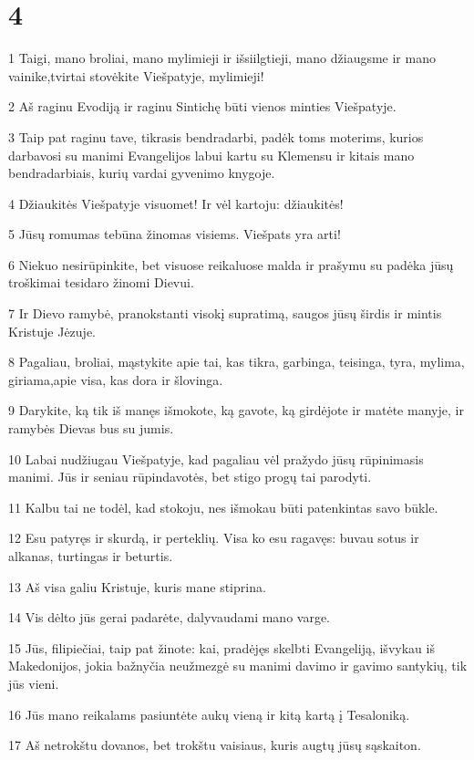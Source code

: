 \chapter{4}


\par 1 Taigi, mano broliai, mano mylimieji ir išsiilgtieji, mano džiaugsme ir mano vainike,­tvirtai stovėkite Viešpatyje, mylimieji! 
\par 2 Aš raginu Evodiją ir raginu Sintichę būti vienos minties Viešpatyje. 
\par 3 Taip pat raginu tave, tikrasis bendradarbi, padėk toms moterims, kurios darbavosi su manimi Evangelijos labui kartu su Klemensu ir kitais mano bendradarbiais, kurių vardai gyvenimo knygoje. 
\par 4 Džiaukitės Viešpatyje visuomet! Ir vėl kartoju: džiaukitės! 
\par 5 Jūsų romumas tebūna žinomas visiems. Viešpats yra arti! 
\par 6 Niekuo nesirūpinkite, bet visuose reikaluose malda ir prašymu su padėka jūsų troškimai tesidaro žinomi Dievui. 
\par 7 Ir Dievo ramybė, pranokstanti visokį supratimą, saugos jūsų širdis ir mintis Kristuje Jėzuje. 
\par 8 Pagaliau, broliai, mąstykite apie tai, kas tikra, garbinga, teisinga, tyra, mylima, giriama,­apie visa, kas dora ir šlovinga. 
\par 9 Darykite, ką tik iš manęs išmokote, ką gavote, ką girdėjote ir matėte manyje, ir ramybės Dievas bus su jumis. 
\par 10 Labai nudžiugau Viešpatyje, kad pagaliau vėl pražydo jūsų rūpinimasis manimi. Jūs ir seniau rūpindavotės, bet stigo progų tai parodyti. 
\par 11 Kalbu tai ne todėl, kad stokoju, nes išmokau būti patenkintas savo būkle. 
\par 12 Esu patyręs ir skurdą, ir perteklių. Visa ko esu ragavęs: buvau sotus ir alkanas, turtingas ir beturtis. 
\par 13 Aš visa galiu Kristuje, kuris mane stiprina. 
\par 14 Vis dėlto jūs gerai padarėte, dalyvaudami mano varge. 
\par 15 Jūs, filipiečiai, taip pat žinote: kai, pradėjęs skelbti Evangeliją, išvykau iš Makedonijos, jokia bažnyčia neužmezgė su manimi davimo ir gavimo santykių, tik jūs vieni. 
\par 16 Jūs mano reikalams pasiuntėte aukų vieną ir kitą kartą į Tesaloniką. 
\par 17 Aš netrokštu dovanos, bet trokštu vaisiaus, kuris augtų jūsų sąskaiton. 
